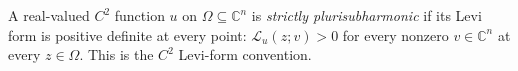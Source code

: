 
A real-valued $C^2$ function $u$ on $\Omega\subseteq\mathbb C^n$ is \emph{strictly plurisubharmonic} if its Levi form is positive definite at every point: $\mathcal L_u(z;v)>0$ for every nonzero $v\in\mathbb C^n$ at every $z\in\Omega$. This is the $C^2$ Levi-form convention.
